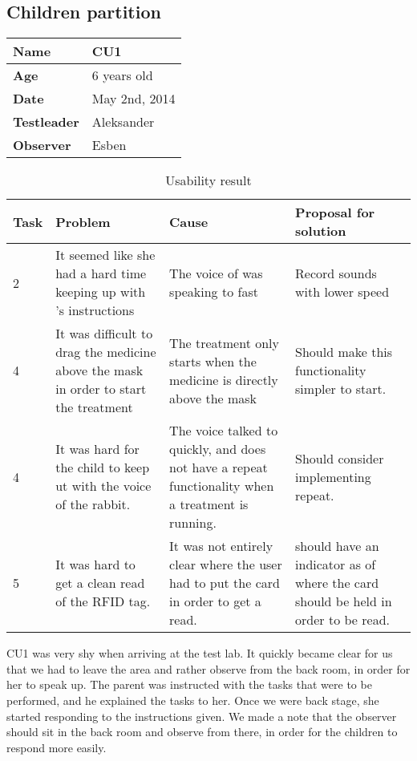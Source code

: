 \subsection{Children partition}

\begin{table}[H]
\begin{tabular}{| p{4.0cm} | p{4.0cm} |}
\hline
 \textbf{Name} & CU1 \\
 \hline
 \textbf{Age} & 6 years old \\
 \hline 
 \textbf{Date} & May 2nd, 2014 \\
 \hline
 \textbf{Testleader} & Aleksander \\
 \hline
 \textbf{Observer} & Esben \\
 \hline
\end{tabular}
\end{table}

\begin{table}[H]
\begin{tabular}{| p{3.0cm} | p{3.0cm} | p{3.0cm} | p{3.0cm} |}
\hline
	\textbf{Task} & \textbf{Problem} & \textbf{Cause} & \textbf{Proposal for solution} \\
	\hline
	2 & It seemed like she had a hard time keeping up with \ab{}'s instructions & The voice of \ab{} was speaking to fast & Record sounds with lower speed \\
	\hline
	4 & It was difficult to drag the medicine above the mask in order to start the treatment & The treatment only starts when the medicine is directly above the mask & Should make this functionality simpler to start.  \\
	\hline
	4 & It was hard for the child to keep ut with the voice of the rabbit. & The voice talked to quickly, and \app{} does not have a repeat functionality when a treatment is running. & Should consider implementing repeat.\\ 
	\hline
	5 & It was hard to get a clean read of the RFID tag. & It was not entirely clear where the user had to put the card in order to get a read. & \ab{} should have an indicator as of where the card should be held in order to be read.  \\
	\hline
\end{tabular}
\label{tab:test2}
\caption{Usability result}
\end{table}

CU1 was very shy when arriving at the test lab. It quickly became clear for us that we had to leave the area and rather observe from the back room, in order for her to speak up. The parent was instructed with the tasks that were to be performed, and he explained the tasks to her. Once we were back stage, she started responding to the instructions given. We made a note that the observer should sit in the back room and observe from there, in order for the children to respond more easily.   

